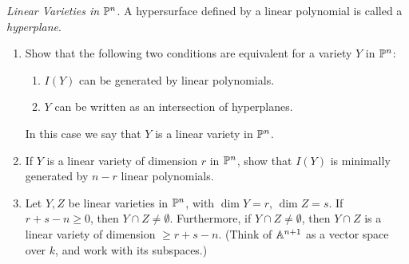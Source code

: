 \label{1.2.11}

\textit{Linear Varieties in} $\P^n$. A hypersurface defined by a linear polynomial is called a \textit{hyperplane}.

\begin{enumerate}[label = (\alph*)]
    \item Show that the following two conditions are equivalent for a variety $Y$ in $\P^n$:
    \begin{enumerate}[label = (\roman*)]
        \item $I(Y)$ can be generated by linear polynomials.
        \item $Y$ can be written as an intersection of hyperplanes.
    \end{enumerate}
    In this case we say that $Y$ is a linear variety in $\P^n$.
    
    \item If $Y$ is a linear variety of dimension $r$ in $\P^n$, show that $I(Y)$ is minimally generated by $n - r$ linear polynomials.
    
    \item Let $Y,Z$ be linear varieties in $\P^n$, with $\dim Y = r$, $\dim Z = s$. If $r + s - n \geq 0$, then $Y \cap Z \neq \emptyset$. Furthermore, if $Y \cap Z \neq \emptyset$, then $Y\cap Z$ is a linear variety of dimension $\geq r + s - n$. (Think of $\A^{n + 1}$ as a vector space over $k$, and work with its subspaces.)
\end{enumerate}


